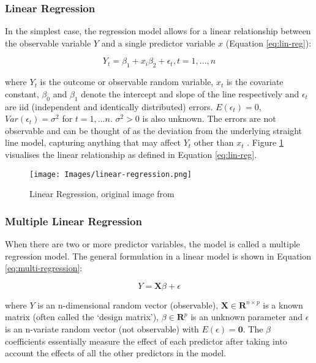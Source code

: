 \subsubsection{Linear Regression}

In the simplest case, the regression model allows for a linear relationship between the observable variable $Y$ and a single predictor variable $x$ (Equation \ref{eq:lin-reg}): 

\begin{equation}
    Y_t = \beta_1 + x_i\beta_2 + \epsilon_t, t = 1, ..., n
    \label{eq:lin-reg}
\end{equation}

where $Y_t$ is the outcome or observable random variable, $x_t$ is the covariate constant, $\beta_0$ and $\beta_1$ denote the intercept and slope of the line respectively and $\epsilon_t$ are iid (independent and identically distributed) errors. $E(\epsilon_t) = 0$, $Var(\epsilon_t) = \sigma^2$ for $t = 1,...n$. $\sigma^2 > 0$ is also unknown. The errors are not observable and can be thought of as the deviation from the underlying straight line model, capturing anything that may affect $Y_t$ other than $x_t$ \cite{forecasting-book}. Figure \ref{fig:lin-reg} visualises the linear relationship as defined in Equation \ref{eq:lin-reg}.

\begin{figure}[H]
\begin{center}
    \texttt{[image: Images/linear-regression.png]}
    \caption{Linear Regression, original image from \cite{forecasting-book}}
    \label{fig:lin-reg}
\end{center}
\end{figure}

\subsubsection{Multiple Linear Regression}

When there are two or more predictor variables, the model is called a multiple regression model. The general formulation in a linear model is shown in Equation \ref{eq:multi-regression}:

\begin{equation}
    Y = \mathbf{X}\beta + \epsilon
    \label{eq:multi-regression}
\end{equation}

where $Y$ is an n-dimensional random vector (observable), $\mathbf{X} \in \mathbf{R} ^{n \times p}$ is a known matrix (often called the `design matrix'), $\beta \in \mathbf{R}^p$ is an unknown parameter and $\epsilon$ is an n-variate random vector (not observable) with $E(\epsilon) = \mathbf{0}$. The $\beta$ coefficients essentially measure the effect of each predictor after taking into account the effects of all the other predictors in the model. \\

